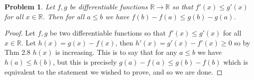 \documentclass{report}
\providecommand{\R}{\mathbb{R}}
\newtheorem{problem}{Problem}
\begin{document}
\begin{problem}
  Let $f,g$ be differentiable functions $\R\to\R$ so that $f'(x)\leq g'(x)$ for all $x\in \R$. Then for all $a\leq b$ we have $f(b)-f(a)\leq g(b)-g(a)$.
\end{problem}

\begin{proof}
  Let $f,g$ be two differentiable functions so that $f'(x)\leq g'(x)$ for all $x\in \R$. Let $h(x)=g(x)-f(x)$, then $h'(x)=g'(x)-f'(x)\geq 0$ so by Thm 2.8 $h(x)$ is increasing. This is to say that for any $a\leq b$ we have $h(a)\leq h(b)$, but this is precisely $g(a)-f(a)\leq g(b)-f(b)$ which is equivalent to the statement we wished to prove, and so we are done.
\end{proof}
\end{document}
